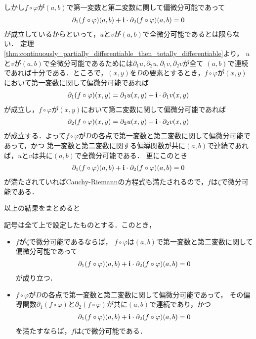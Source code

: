	しかし$f \circ \varphi$が$(a,b)$で第一変数と第二変数に関して偏微分可能であって
	\begin{align}
		\partial_1 (f \circ \varphi) (a,b) + \mathbf{i} \cdot \partial_2 (f \circ \varphi)(a,b) = 0
	\end{align}
	が成立しているからといって，$u$と$v$が$(a,b)$で全微分可能であるとは限らない．
	定理\ref{thm:continuously_partially_differentiable_then_totally_differentiable}より，
	$u$と$v$が$(a,b)$で全微分可能であるためには$\partial_1 u,\partial_2 u,\partial_1 v,\partial_2 v$が全て
	$(a,b)$で連続であれば十分である．ところで，$(x,y)$を$D$の要素とするとき，$f \circ \varphi$が$(x,y)$において第一変数に関して偏微分可能であれば
	\begin{align}
		\partial_1 (f \circ \varphi)(x,y) = \partial_1 u(x,y) + \mathbf{i} \cdot \partial_1 v(x,y)
	\end{align}
	が成立し，$f \circ \varphi$が$(x,y)$において第二変数に関して偏微分可能であれば
	\begin{align}
		\partial_2 (f \circ \varphi)(x,y) = \partial_2 u(x,y) + \mathbf{i} \cdot \partial_2 v(x,y)
	\end{align}
	が成立する．よって$f \circ \varphi$が$D$の各点で第一変数と第二変数に関して偏微分可能であって，かつ
	第一変数と第二変数に関する偏導関数が共に$(a,b)$で連続であれば，$u$と$v$は共に$(a,b)$で全微分可能である．
	更にこのとき
	\begin{align}
		\partial_1 (f \circ \varphi) (a,b) + \mathbf{i} \cdot \partial_2 (f \circ \varphi)(a,b) = 0
	\end{align}
	が満たされていればCauchy-Riemannの方程式も満たされるので，$f$は$\zeta$で微分可能である．
	
	以上の結果をまとめると
	
	\begin{screen}
		\begin{thm}[微分可能性と連続偏微分可能性]
		\label{thm:differentiable_iff_continuously_partially_differentiable}
			記号は全て上で設定したものとする．このとき，
			\begin{itemize}
				\item $f$が$\zeta$で微分可能であるならば，
					$f \circ \varphi$は$(a,b)$で第一変数と第二変数に関して偏微分可能であって
					\begin{align}
						\partial_1 (f \circ \varphi) (a,b) + \mathbf{i} \cdot \partial_2 (f \circ \varphi)(a,b) = 0
					\end{align}
					が成り立つ．
				\item $f \circ \varphi$が$D$の各点で第一変数と第二変数に関して偏微分可能であって，
					その偏導関数$\partial_1 (f \circ \varphi)$と$\partial_2 (f \circ \varphi)$が共に$(a,b)$で連続であり，かつ
					\begin{align}
						\partial_1 (f \circ \varphi) (a,b) + \mathbf{i} \cdot \partial_2 (f \circ \varphi)(a,b) = 0
					\end{align}
					を満たすならば，$f$は$\zeta$で微分可能である．
			\end{itemize}
		\end{thm}
	\end{screen}
	
